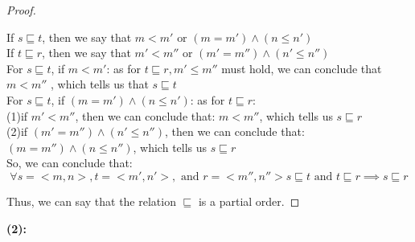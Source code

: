\documentclass [9 pt]{article}
\theoremstyle{definition}
\begin{document}
\begin{proof}
\begin{itemize}
				If $s \sqsubseteq t $, then we say that $  m < m' \text{ or }(m = m') \wedge (n \leq n') $\\
		If $t \sqsubseteq r $, then we say that $  m' < m'' \text{ or }(m' = m'') \wedge (n' \leq n'') $\\
		\newline
		For $s \sqsubseteq t$, if $m < m'$: as for $t \sqsubseteq r, m' \leq m'' $ must hold, we can conclude that $ m < m'' $ , which tells us that $s \sqsubseteq t$\\
		\newline
		For $s \sqsubseteq t$, if $ (m = m') \wedge (n \leq n') $: as for $t \sqsubseteq r: \quad$ \\
		(1)if $m' < m'' $, then we can conclude that: $m < m'' $, which tells us $s \sqsubseteq r $\\
		(2)if $ (m' = m'') \wedge (n' \leq n'') $, then we can conclude that: $ (m = m'') \wedge (n \leq n'') $, which tells us $s \sqsubseteq r$\\
		\newline
		So, we can conclude that: 
		 $$ \forall s = <m ,n>, t = <m', n'>,\text{ and } r = <m'', n''> s \sqsubseteq t \text{ and } t \sqsubseteq r \implies s \sqsubseteq r  $$    
	\end{itemize}
	Thus, we can say that the relation $\sqsubseteq$ is a partial order. 
\end{proof}
\textbf{(2):}\\
\end{document}
